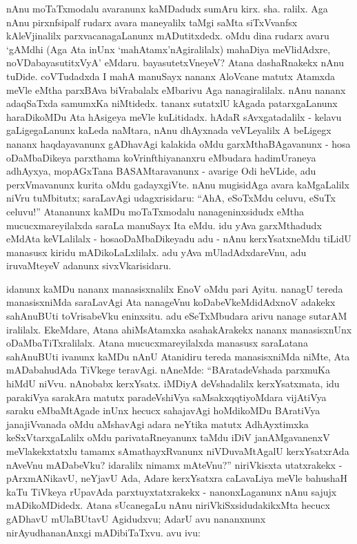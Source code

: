 nAnu moTaTxmodalu avaranunx kaMDadudx sumAru kirx. sha. ralilx. Aga nAnu pirxnfsipalf rudarx avara maneyalilx taMgi saMta siTxVvanfsx kAleVjinalilx parxvacanagaLanunx mADutitxdedx. oMdu dina rudarx avaru `gAMdhi (Aga Ata inUnx `mahAtamx'nAgiralilalx) mahaDiya meVlidAdxre, noVDabayasutitxVyA' eMdaru. bayasutetxVneyeV? Atana dashaRnakekx nAnu tuDide. coVTudadxda I mahA manuSayx nananx AloVcane matutx Atamxda meVle eMtha parxBAva biVrabalalx eMbarivu Aga nanagiralilalx. nAnu nananx adaqSaTxda samumxKa niMtidedx. tananx sutatxlU kAgada patarxgaLanunx haraDikoMDu Ata hAsigeya meVle kuLitidadx. hAdaR sAvxgatadalilx - kelavu gaLigegaLanunx kaLeda naMtara, nAnu dhAyxnada veVLeyalilx A beLigegx nananx haqdayavanunx gADhavAgi kalakida oMdu garxMthaBAgavanunx - hosa oDaMbaDikeya parxthama koVrinfthiyananxru eMbudara hadimUraneya adhAyxya, mopAGxTana BASAMtaravanunx - avarige Odi heVLide, adu perxVmavanunx kurita oMdu gadayxgiVte. nAnu mugisidAga avara kaMgaLalilx niVru tuMbitutx; saraLavAgi udagxrisidaru: ``AhA, eSoTxMdu celuvu, eSuTx celuvu!'' Atananunx kaMDu moTaTxmodalu nanageninxsidudx eMtha mucucxmareyilalxda saraLa manuSayx Ita eMdu. idu yAva garxMthadudx eMdAta keVLalilalx - hosaoDaMbaDikeyadu adu - nAnu kerxYsatxneMdu tiLidU manasusx kiridu mADikoLaLxlilalx. adu yAva mUladAdxdareVnu, adu iruvaMteyeV adanunx sivxVkarisidaru.

idanunx kaMDu nananx manasisxnalilx EnoV oMdu pari Ayitu. nanagU tereda manasisxniMda saraLavAgi Ata nanageVnu koDabeVkeMdidAdxnoV adakekx sahAnuBUti toVrisabeVku eninxsitu. adu eSeTxMbudara arivu nanage sutarAM iralilalx. EkeMdare, Atana ahiMsAtamxka asahakArakekx nananx manasisxnUnx oDaMbaTiTxralilalx. Atana mucucxmareyilalxda manasusx saraLatana sahAnuBUti ivanunx kaMDu nAnU Atanidiru tereda manasisxniMda niMte, Ata mADabahudAda TiVkege teravAgi. nAneMde: ``BAratadeVshada parxmuKa hiMdU niVvu. nAnobabx kerxYsatx. iMDiyA deVshadalilx kerxYsatxmata, idu parakiVya sarakAra matutx paradeVshiVya saMsakxqqtiyoMdara vijAtiVya saraku eMbaMtAgade inUnx hecucx sahajavAgi hoMdikoMDu BAratiVya janajiVvanada oMdu aMshavAgi adara neYtika matutx AdhAyxtimxka keSxVtarxgaLalilx oMdu parivataRneyanunx taMdu iDiV janAMgavanenxV meVlakekxtatxlu tamamx sAmathayxRvanunx niVDuvaMtAgalU kerxYsatxrAda nAveVnu mADabeVku? idaralilx nimamx mAteVnu?'' niriVkisxta utatxrakekx - pArxmANikavU, neYjavU Ada, Adare kerxYsatxra caLavaLiya meVle bahushaH kaTu TiVkeya rUpavAda parxtuyxtatxrakekx - nanonxLaganunx nAnu sajujx mADikoMDidedx. Atana sUcanegaLu nAnu niriVkiSxsidudakikxMta hecucx gADhavU mUlaBUtavU Agidudxvu; AdarU avu nananxnunx nirAyudhananAnxgi mADibiTaTxvu. avu ivu:

